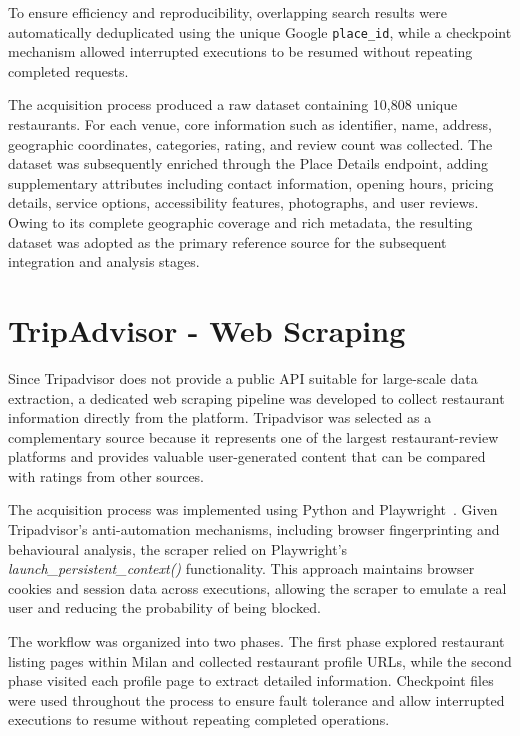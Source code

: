 To ensure efficiency and reproducibility, overlapping search results were automatically deduplicated using the unique Google \texttt{place\_id}, while a checkpoint mechanism allowed interrupted executions to be resumed without repeating completed requests.

The acquisition process produced a raw dataset containing 10,808 unique restaurants. For each venue, core information such as identifier, name, address, geographic coordinates, categories, rating, and review count was collected. The dataset was subsequently enriched through the Place Details endpoint, adding supplementary attributes including contact information, opening hours, pricing details, service options, accessibility features, photographs, and user reviews. Owing to its complete geographic coverage and rich metadata, the resulting dataset was adopted as the primary reference source for the subsequent integration and analysis stages.

\section{TripAdvisor - Web Scraping}

Since Tripadvisor does not provide a public API suitable for large-scale data extraction, a dedicated web scraping pipeline was developed to collect restaurant information directly from the platform. Tripadvisor was selected as a complementary source because it represents one of the largest restaurant-review platforms and provides valuable user-generated content that can be compared with ratings from other sources.

The acquisition process was implemented using Python and Playwright~\cite{playwright}. Given Tripadvisor's anti-automation mechanisms, including browser fingerprinting and behavioural analysis, the scraper relied on Playwright's \textit{launch\_persistent\_context()} functionality. This approach maintains browser cookies and session data across executions, allowing the scraper to emulate a real user and reducing the probability of being blocked.

The workflow was organized into two phases. The first phase explored restaurant listing pages within Milan and collected restaurant profile URLs, while the second phase visited each profile page to extract detailed information. Checkpoint files were used throughout the process to ensure fault tolerance and allow interrupted executions to resume without repeating completed operations.

